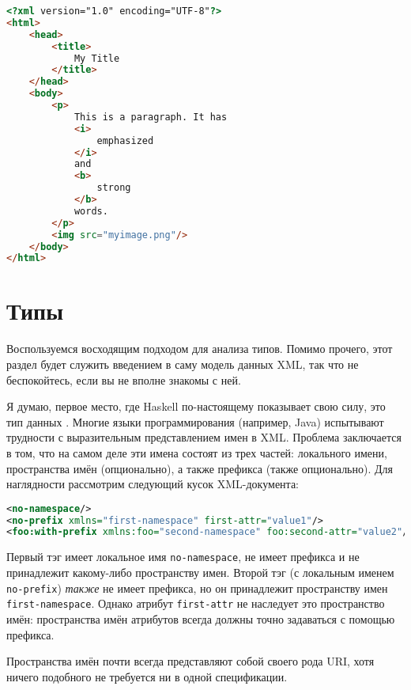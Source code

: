 
\begin{lstlisting}[language=HTML, caption={Выходные данные в формате XHTML}]
<?xml version="1.0" encoding="UTF-8"?>
<html>
    <head>
        <title>
            My Title
        </title>
    </head>
    <body>
        <p>
            This is a paragraph. It has 
            <i>
                emphasized
            </i>
            and 
            <b>
                strong
            </b>
            words.
        </p>
        <img src="myimage.png"/>
    </body>
</html>
\end{lstlisting}

\section{Типы} %

Воспользуемся восходящим подходом для анализа типов. Помимо прочего, этот раздел будет служить введением в саму модель данных XML, так что не беспокойтесь, если вы не вполне знакомы с ней.

Я думаю, первое место, где Haskell по-настоящему показывает свою силу, это тип данных . Многие языки программирования (например, Java) испытывают трудности с выразительным представлением имен в XML. Проблема заключается в том, что на самом деле эти имена состоят из трех частей: локального имени, пространства имён (опционально), а также префикса (также опционально). Для наглядности рассмотрим следующий кусок XML-документа:

\begin{lstlisting}[language=XML]
<no-namespace/>
<no-prefix xmlns="first-namespace" first-attr="value1"/>
<foo:with-prefix xmlns:foo="second-namespace" foo:second-attr="value2"/>
\end{lstlisting}

Первый тэг имеет локальное имя \lstinline!no-namespace!, не имеет префикса и не принадлежит какому-либо пространству имен. Второй тэг (с локальным именем \lstinline!no-prefix!) \emph{также} не имеет префикса, но он принадлежит пространству имен \lstinline!first-namespace!. Однако атрибут \lstinline!first-attr! не наследует это пространство имён: пространства имён атрибутов всегда должны точно задаваться с помощью префикса.

\begin{remark}
Пространства имён почти всегда представляют собой своего рода URI, хотя ничего подобного не требуется ни в одной спецификации.
\end{remark}

